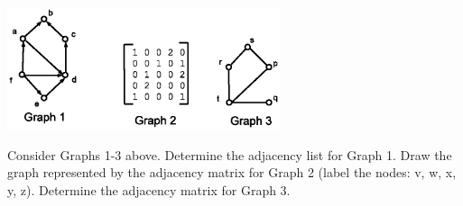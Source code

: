 \begin{questions}



\begin{center}
\includegraphics[width=0.6\textwidth]{figs/graph-representation.eps}
\end{center}
 Consider Graphs 1-3 above.  Determine the adjacency list for Graph 1. Draw the graph represented by the adjacency matrix for Graph 2 (label the nodes: v, w, x, y, z). Determine the adjacency matrix for Graph 3. 


\end{questions}
